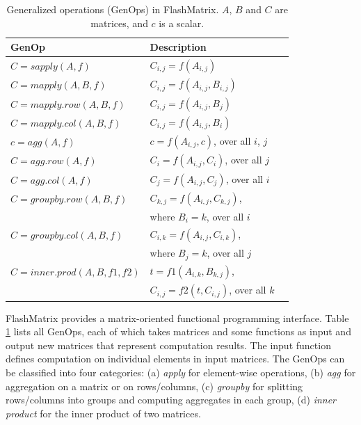 \begin{table}
\begin{center}
\footnotesize
\begin{tabular}{|l|l|l|}
\hline
GenOp & Description \\
\hline
$C=sapply(A, f)$ & $C_{i,j}=f(A_{i,j})$ \\
\hline
$C=mapply(A, B, f)$ & $C_{i,j}=f(A_{i,j}, B_{i,j})$ \\
\hline
$C=mapply.row(A, B, f)$ & $C_{i,j}=f(A_{i,j}, B_j)$ \\
\hline
$C=mapply.col(A, B, f)$ & $C_{i,j}=f(A_{i,j}, B_i)$ \\
\hline
$c=agg(A, f)$ & $c=f(A_{i,j}, c)$, over all $i$, $j$ \\
\hline
$C=agg.row(A, f)$ & $C_i=f(A_{i,j}, C_i)$, over all $j$ \\
\hline
$C=agg.col(A, f)$ & $C_j=f(A_{i,j}, C_j)$, over all $i$ \\
\hline
$C=groupby.row(A, B, f)$ & $C_{k,j}=f(A_{i,j}, C_{k,j})$,\\ & where $B_i=k$, over all $i$ \\
\hline
$C=groupby.col(A, B, f)$ & $C_{i,k}=f(A_{i,j}, C_{i,k})$,\\ & where $B_j=k$, over all $j$ \\
\hline
$C=inner.prod(A, B, f1, f2)$ & $t=f1(A_{i,k}, B_{k,j})$,
\\ & $C_{i,j}=f2(t, C_{i,j})$, over all $k$ \\
\hline
\end{tabular}
\normalsize
\end{center}
\vspace{-12pt}
\caption{Generalized operations (GenOps) in FlashMatrix.
$A$, $B$ and $C$ are matrices, and $c$ is a scalar.}
\label{tbl:genops}
\vspace{-10pt}
\end{table}

FlashMatrix provides a matrix-oriented functional programming interface.
Table \ref{tbl:genops} lists all GenOps, each of which takes matrices and
some functions as input and output new matrices that represent computation results.
The input function defines computation on individual elements in input matrices.
The GenOps can be classified into four categories: (a) \textit{apply} for
element-wise operations, (b) \textit{agg} for aggregation on a matrix
or on rows/columns, (c) \textit{groupby} for splitting rows/columns
into groups and computing aggregates in each group,
(d) \textit{inner product} for the inner product of two matrices.

